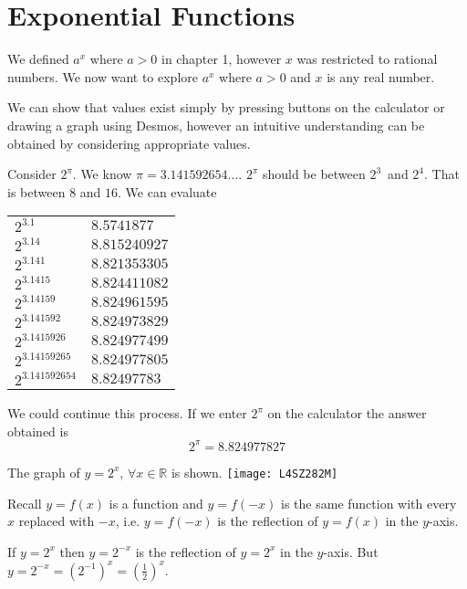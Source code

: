 \chapter{Exponential Functions}

We defined $a^{x}$ where $a >0$ in chapter 1, however $x$ was restricted to rational numbers. We now want to explore $a^{x}$ where $a >0$ and $x$ is any real number. 

We can show that values exist simply by pressing buttons on the calculator or drawing
a graph using Desmos, however an intuitive understanding can be obtained by considering appropriate values. 

Consider $2^{\pi }$. We know $\pi  =3.141592654 \ldots $. $2^{\pi }$ should be between $2^{3}$\ and $2^{4}$. That is between $8$ and $16$. We can evaluate 

\qquad \qquad \qquad \qquad \qquad \qquad \qquad \qquad
\begin{tabular}[c]{ll}$2^{3.1}$  & $8.5741877$  \\
$2^{3.14}$  & $8.815240927$  \\
$2^{3.141}$  & $8.821353305$  \\
$2^{3.1415}$  & $8.824411082$  \\
$2^{3.14159}$  & $8.824961595$  \\
$2^{3.141592}$  & $8.824973829$  \\
$2^{3.1415926}$  & $8.824977499$  \\
$2^{3.14159265}$  & $8.824977805$  \\
$2^{3.141592654}$  & $8.82497783$
\end{tabular}

We could continue this process. If
we enter $2^{\pi }$ on the calculator the answer obtained is
\begin{equation*}2^{\pi } =8.824977827
\end{equation*}

The graph of $y =2^{x}$, $ \forall x \in \mathbb{R}$ is shown. 
\texttt{[image: L4SZ282M]}

Recall $y =f (x)$ is a function and $y =f ( -x)$ is the same function with every $x$ replaced with $ -x$, i.e. $y =f ( -x)$ is the reflection of $y =f (x)$ in the $y$-axis. 

If $y =2^{x}$ then $y =2^{ -x}$ is the reflection of $y =2^{x}$ in the $y$-axis. But $y =2^{ -x} =\left (2^{ -1}\right )^{x} =\genfrac{(}{)}{}{}{1}{2}^{x}$. 

